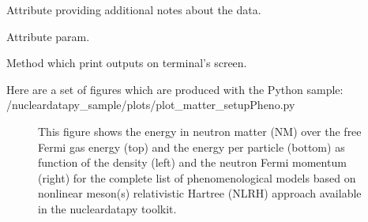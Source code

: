 \documentclass[letterpaper,10pt,english]{sphinxmanual}
\begin{document}
\begin{fulllineitems}
\begin{fulllineitems}
\end{fulllineitems}


\begin{fulllineitems}
\label{\detokenize{source/api/setup_matter_pheno:nucleardatapy.matter.setup_pheno.setupPheno.note}}
\pysigstartsignatures
{}
\pysigstopsignatures
\sphinxAtStartPar
Attribute providing additional notes about the data.

\end{fulllineitems}


\begin{fulllineitems}
\label{\detokenize{source/api/setup_matter_pheno:nucleardatapy.matter.setup_pheno.setupPheno.param}}
\pysigstartsignatures
{}
\pysigstopsignatures
\sphinxAtStartPar
Attribute param.

\end{fulllineitems}


\begin{fulllineitems}
\label{\detokenize{source/api/setup_matter_pheno:nucleardatapy.matter.setup_pheno.setupPheno.print_outputs}}
\pysigstartsignatures
{}
\pysigstopsignatures
\sphinxAtStartPar
Method which print outputs on terminal’s screen.

\end{fulllineitems}


\end{fulllineitems}


\sphinxAtStartPar
Here are a set of figures which are produced with the Python sample: /nucleardatapy\_sample/plots/plot\_matter\_setupPheno.py

\begin{figure}[htbp]
\centering
\capstart

\noindent{}
\caption{This figure shows the energy in neutron matter (NM) over the free Fermi gas energy (top) and the energy per particle (bottom) as function of the density (left) and the neutron Fermi momentum (right) for the complete list of phenomenological models based on non\sphinxhyphen{}linear meson(s) relativistic Hartree (NLRH) approach available in the nucleardatapy toolkit.}\label{\detokenize{source/api/setup_matter_pheno:id1}}\end{figure}
\end{document}
